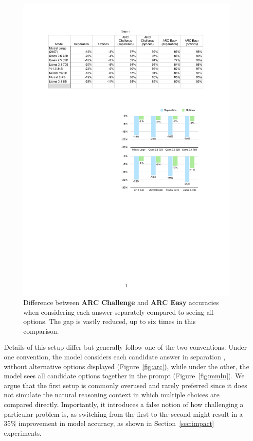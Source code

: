 \documentclass[11pt]{article}
\DeclareRobustCommand{\shl}[3]{
  \begingroup\setlength{\fboxsep}{2pt}%
  \colorbox{#1}{{\hspace*{2pt}\vphantom{Ay}#2\hspace*{2pt}}}%
  \endgroup
}
\begin{document}
\begin{figure}[ht]
    \centering
    \includegraphics[width=\linewidth]{images/difference_vertical.pdf}
    \caption{Difference between {\color{snownavy}\textbf{ARC Challenge}} and {\color{snownavy}\textbf{ARC Easy}} accuracies when considering each answer separately compared to seeing all options. The gap is vastly reduced, up to six times in this comparison.}
    \label{fig:difference}
\end{figure}

Details of this setup differ but generally follow one of the two conventions. 
Under one convention, the model considers each candidate answer in \shl{separation}{separation}{}, without alternative options displayed (Figure~\ref{fig:arc}), while under the other, the model sees all candidate \shl{all}{options}{} together in the prompt (Figure~\ref{fig:mmlu}).
We argue that the first setup is commonly overused and rarely preferred since it does not simulate the natural reasoning context in which multiple choices are compared directly. Importantly, it introduces a false notion of how challenging a particular problem is, as switching from the first to the second might result in a 35\% improvement in model accuracy, as shown in Section~\ref{sec:impact} experiments.
\end{document}
